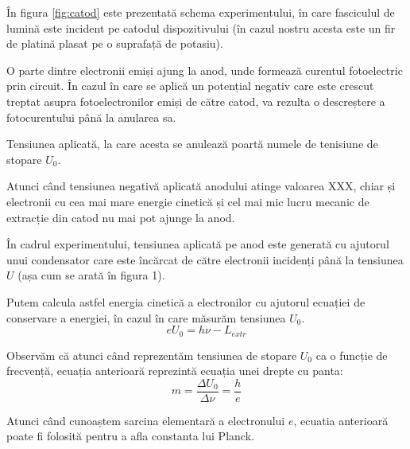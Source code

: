 \documentclass[a4paper]{article}
\begin{document}
În figura \ref{fig:catod} este prezentată schema experimentului, în care fasciculul de lumină
este incident pe catodul dispozitivului (în cazul nostru acesta este un fir de
platină plasat pe o suprafață de potasiu).

O parte dintre electronii emiși ajung la anod, unde formează curentul
fotoelectric prin circuit. În cazul în care se aplică un potențial negativ care
este crescut treptat asupra fotoelectronilor emiși de către catod, va rezulta o
descreștere a fotocurentului până la anularea sa.

Tensiunea aplicată, la care acesta se anulează poartă numele de tenisiune de
stopare $U_0$.

Atunci când tensiunea negativă aplicată anodului atinge valoarea XXX, chiar și
electronii cu cea mai mare energie cinetică și cel mai mic lucru mecanic de
extracție din catod nu mai pot ajunge la anod.

În cadrul experimentului, tensiunea aplicată pe anod este generată cu ajutorul
unui condensator care este încărcat de către electronii incidenți până la
tensiunea $U$ (așa cum se arată în figura 1).

Putem calcula astfel energia cinetică a electronilor cu ajutorul ecuației de
conservare a energiei, în cazul în care măsurăm tensiunea $U_0$.
\begin{equation}
	e U_0 = h \nu - L_{extr}
\end{equation}

Observăm că atunci când reprezentăm tensiunea de stopare $U_0$ ca o funcție de
frecvență, ecuația anterioară reprezintă ecuația unei drepte cu panta:
\begin{equation}
	m = \frac{\Delta U_0}{\Delta \nu} = \frac{h}{e}
\end{equation}

Atunci când cunoaștem sarcina elementară a electronului $e$, ecuatia anterioară
poate fi folosită pentru a afla constanta lui Planck.
\end{document}

